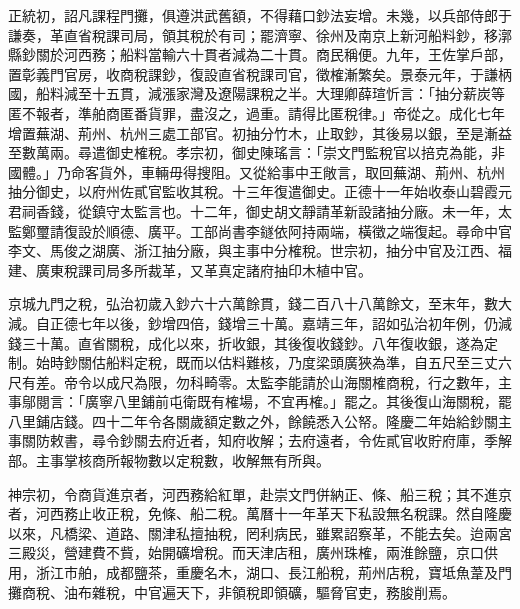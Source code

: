 正統初，詔凡課程門攤，俱遵洪武舊額，不得藉口鈔法妄增。未幾，以兵部侍郎于謙奏，革直省稅課司局，領其稅於有司；罷濟寧、徐州及南京上新河船料鈔，移漷縣鈔關於河西務；船料當輸六十貫者減為二十貫。商民稱便。九年，王佐掌戶部，置彰義門官房，收商稅課鈔，復設直省稅課司官，徵榷漸繁矣。景泰元年，于謙柄國，船料減至十五貫，減漲家灣及遼陽課稅之半。大理卿薛瑄忻言：「抽分薪炭等匿不報者，準舶商匿番貨罪，盡沒之，過重。請得比匿稅律。」帝從之。成化七年增置蕪湖、荊州、杭州三處工部官。初抽分竹木，止取鈔，其後易以銀，至是漸益至數萬兩。尋遣御史榷稅。孝宗初，御史陳瑤言：「崇文門監稅官以掊克為能，非國體。」乃命客貨外，車輛毋得搜阻。又從給事中王敞言，取回蕪湖、荊州、杭州抽分御史，以府州佐貳官監收其稅。十三年復遣御史。正德十一年始收泰山碧霞元君祠香錢，從鎮守太監言也。十二年，御史胡文靜請革新設諸抽分廠。未一年，太監鄭璽請復設於順德、廣平。工部尚書李鐩依阿持兩端，橫徵之端復起。尋命中官李文、馬俊之湖廣、浙江抽分廠，與主事中分榷稅。世宗初，抽分中官及江西、福建、廣東稅課司局多所裁革，又革真定諸府抽印木植中官。

京城九門之稅，弘治初歲入鈔六十六萬餘貫，錢二百八十八萬餘文，至末年，數大減。自正德七年以後，鈔增四倍，錢增三十萬。嘉靖三年，詔如弘治初年例，仍減錢三十萬。直省關稅，成化以來，折收銀，其後復收錢鈔。八年復收銀，遂為定制。始時鈔關估船料定稅，既而以估料難核，乃度梁頭廣狹為準，自五尺至三丈六尺有差。帝令以成尺為限，勿科畸零。太監李能請於山海關榷商稅，行之數年，主事鄔閱言：「廣寧八里鋪前屯衛既有榷場，不宜再榷。」罷之。其後復山海關稅，罷八里鋪店錢。四十二年令各關歲額定數之外，餘饒悉入公帑。隆慶二年始給鈔關主事關防敕書，尋令鈔關去府近者，知府收解；去府遠者，令佐貳官收貯府庫，季解部。主事掌核商所報物數以定稅數，收解無有所與。

神宗初，令商貨進京者，河西務給紅單，赴崇文門併納正、條、船三稅；其不進京者，河西務止收正稅，免條、船二稅。萬曆十一年革天下私設無名稅課。然自隆慶以來，凡橋梁、道路、關津私擅抽稅，罔利病民，雖累詔察革，不能去矣。迨兩宮三殿災，營建費不貲，始開礦增稅。而天津店租，廣州珠榷，兩淮餘鹽，京口供用，浙江市舶，成都鹽茶，重慶名木，湖口、長江船稅，荊州店稅，寶坻魚葦及門攤商稅、油布雜稅，中官遍天下，非領稅即領礦，驅脅官吏，務朘削焉。

